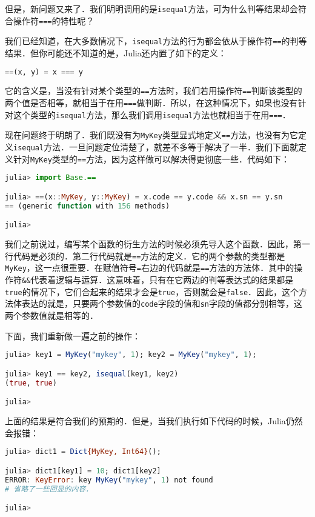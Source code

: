但是，新问题又来了．我们明明调用的是\verb|isequal|方法，可为什么判等结果却会符合操作符\verb|===|的特性呢？

我们已经知道，在大多数情况下，\verb|isequal|方法的行为都会依从于操作符\verb|==|的判等结果．但你可能还不知道的是，Julia还内置了如下的定义：
\begin{lstlisting}[language=julia]
==(x, y) = x === y
\end{lstlisting}

它的含义是，当没有针对某个类型的\verb|==|方法时，我们若用操作符\verb|==|判断该类型的两个值是否相等，就相当于在用\verb|===|做判断．所以，在这种情况下，如果也没有针对这个类型的\verb|isequal|方法，那么我们调用\verb|isequal|方法也就相当于在用\verb|===|．

现在问题终于明朗了．我们既没有为\verb|MyKey|类型显式地定义\verb|==|方法，也没有为它定义\verb|isequal|方法．一旦问题定位清楚了，就差不多等于解决了一半．我们下面就定义针对\verb|MyKey|类型的\verb|==|方法，因为这样做可以解决得更彻底一些．代码如下：
\begin{lstlisting}[language=julia]
julia> import Base.==

julia> ==(x::MyKey, y::MyKey) = x.code == y.code && x.sn == y.sn
== (generic function with 156 methods)

julia> 
\end{lstlisting}

我们之前说过，编写某个函数的衍生方法的时候必须先导入这个函数．因此，第一行代码是必须的．第二行代码就是\verb|==|方法的定义．它的两个参数的类型都是\verb|MyKey|，这一点很重要．在赋值符号\verb|=|右边的代码就是\verb|==|方法的方法体．其中的操作符\verb|&&|代表着逻辑与运算．这意味着，只有在它两边的判等表达式的结果都是\verb|true|的情况下，它们合起来的结果才会是\verb|true|，否则就会是\verb|false|．因此，这个方法体表达的就是，只要两个参数值的\verb|code|字段的值和\verb|sn|字段的值都分别相等，这两个参数值就是相等的．

下面，我们重新做一遍之前的操作：
\begin{lstlisting}[language=julia]
julia> key1 = MyKey("mykey", 1); key2 = MyKey("mykey", 1);

julia> key1 == key2, isequal(key1, key2)
(true, true)

julia>
\end{lstlisting}

上面的结果是符合我们的预期的．但是，当我们执行如下代码的时候，Julia仍然会报错：
\begin{lstlisting}[language=julia]
julia> dict1 = Dict{MyKey, Int64}(); 

julia> dict1[key1] = 10; dict1[key2]
ERROR: KeyError: key MyKey("mykey", 1) not found
# 省略了一些回显的内容．

julia>  
\end{lstlisting}

